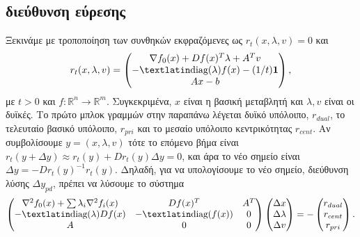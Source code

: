 \subsection{ διεύθυνση εύρεσης}
Ξεκινάμε με τροποποίηση των συνθηκών  εκφραζόμενες ως
\( r_t(x, \lambda, v) = 0 \) και
\begin{equation*}
    r_t(x, \lambda, v) = \begin{pmatrix}
        \nabla f_0(x) + Df(x)^T\lambda + A^Tv \\
        -\mathtxt{diag}(\lambda)f(x) - (1/t)\vc{1} \\
        Ax - b
    \end{pmatrix},
\end{equation*}
με \( t > 0\) και \( f: \mathbb{R}^n \to \mathbb{R}^m \). Συγκεκριμένα, \(x\)
είναι η βασική μεταβλητή και \(\lambda, v\) είναι οι δυϊκές. Το πρώτο μπλοκ
γραμμών στην παραπάνω λέγεται δυϊκό υπόλοιπο, \(r_{dual} \), το τελευταίο βασικό
υπόλοιπο, \(r_{pri} \) και το μεσαίο υπόλοιπο κεντρικότητας \(r_{cent} \).
Αν συμβολίσουμε \( y = (x, \lambda, v) \) τότε το επόμενο βήμα 
είναι \( r_t(y + \Delta y) \approx r_t(y) + Dr_t(y)\Delta y = 0 \),
και άρα το νέο σημείο είναι \( \Delta y = -Dr_t(y)^{-1}r_t(y) \). Δηλαδή,
για να υπολογίσουμε το νέο σημείο,  διεύθυνση λύσης \(\Delta
y_{pd} \), πρέπει να λύσουμε το σύστημα
\begin{equation*}
    \begin{pmatrix}
        \nabla^2 f_0(x) + \sum \lambda_i \nabla^2 f_i(x) & Df(x)^T & A^T \\
        -\mathtxt{diag}(\lambda)Df(x) & - \mathtxt{diag}(f(x)) & 0 \\
        A & 0 & 0
    \end{pmatrix}
    \begin{pmatrix}
        \Delta x\\
        \Delta \lambda\\
        \Delta v
    \end{pmatrix} = -
    \begin{pmatrix}
        r_{dual}\\
        r_{cent}\\
        r_{pri}
    \end{pmatrix}.
\end{equation*}

